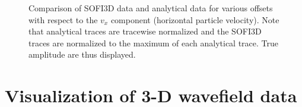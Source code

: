 \documentclass[11pt,onecolumn,oneside]{article}
\begin{document}
\begin{figure}[ht]
\begin{center}
\caption{\label{analytic_sofi3D_vx} Comparison of SOFI3D data and analytical data for various offsets with respect to the $v_x$ component (horizontal particle velocity). Note that analytical traces are tracewise normalized and the SOFI3D traces are normalized to the maximum of each analytical trace. True amplitude are thus displayed.}
\end{center}
\end{figure} 

\clearpage

\section{Visualization of 3-D wavefield data}\label{visual}
\end{document}
